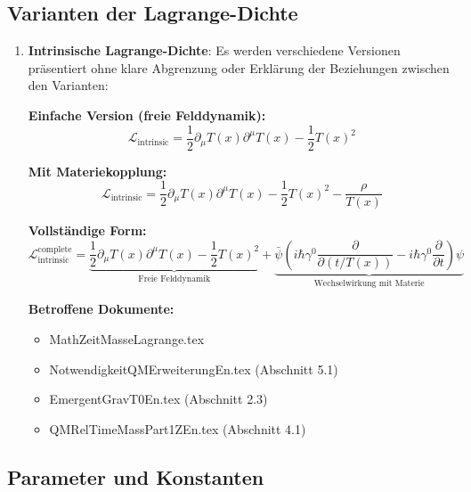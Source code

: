 \documentclass[12pt,a4paper]{article}
\newcommand{\Tfield}{T(x)}
\begin{document}
	\subsection{Varianten der Lagrange-Dichte}
	
	\begin{enumerate}[label=\textbf{P\arabic*.},resume]
		\item \textbf{Intrinsische Lagrange-Dichte}: Es werden verschiedene Versionen präsentiert ohne klare Abgrenzung oder Erklärung der Beziehungen zwischen den Varianten:
		
		\textbf{Einfache Version (freie Felddynamik):}
		\begin{equation}
			\mathcal{L}_{\text{intrinsic}} = \frac{1}{2} \partial_\mu \Tfield \partial^\mu \Tfield - \frac{1}{2}\Tfield^2
		\end{equation}
		
		\textbf{Mit Materiekopplung:}
		\begin{equation}
			\mathcal{L}_{\text{intrinsic}} = \frac{1}{2} \partial_\mu \Tfield \partial^\mu \Tfield - \frac{1}{2}\Tfield^2 - \frac{\rho}{\Tfield}
		\end{equation}
		
		\textbf{Vollständige Form:}
		\begin{equation}
			\mathcal{L}_{\text{intrinsic}}^{\text{complete}} = \underbrace{\frac{1}{2} \partial_\mu \Tfield \partial^\mu \Tfield - \frac{1}{2}\Tfield^2}_{\text{Freie Felddynamik}} + \underbrace{\bar{\psi} \left( i\hbar \gamma^0 \frac{\partial}{\partial (t/\Tfield)} - i\hbar \gamma^0 \frac{\partial}{\partial t} \right) \psi}_{\text{Wechselwirkung mit Materie}}
		\end{equation}
		
		\textbf{Betroffene Dokumente:}
		\begin{itemize}
			\item MathZeitMasseLagrange.tex
			\item NotwendigkeitQMErweiterungEn.tex (Abschnitt 5.1)
			\item EmergentGravT0En.tex (Abschnitt 2.3)
			\item QMRelTimeMassPart1ZEn.tex (Abschnitt 4.1)
		\end{itemize}
	\end{enumerate}
	
	\subsection{Parameter und Konstanten}
	
\end{document}
